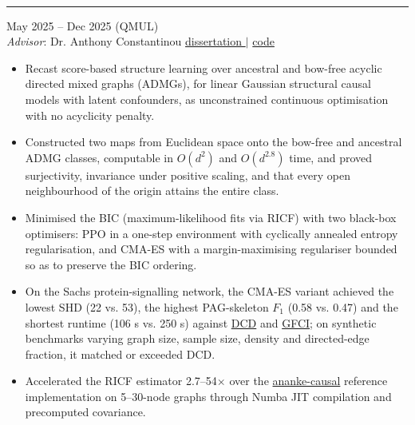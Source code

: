 \documentclass[9pt]{extarticle}
\begin{document}
{    %
    \vspace{10pt}
     \\
    \vspace{-7pt}
    \hrule
    \vspace{5pt}
     \hfill May 2025 -- Dec 2025 (QMUL) \\
    \textit{Advisor}: Dr. Anthony Constantinou \hfill \href{https://github.com/TheDansmod/qmul-msc-ai-code-master-thesis/blob/main/dissertation_report.pdf}{dissertation \faExternalLink*} $\vert$ \href{https://github.com/TheDansmod/qmul-msc-ai-code-master-thesis}{code \faExternalLink*}
    \begin{itemize}[leftmargin=*]
        \item Recast score-based structure learning over ancestral and bow-free acyclic directed mixed graphs (ADMGs), for linear Gaussian structural causal models with latent confounders, as unconstrained continuous optimisation with no acyclicity penalty.
        \item Constructed two maps from Euclidean space onto the bow-free and ancestral ADMG classes, computable in \(O(d^2)\) and \(O(d^2.8)\) time, and proved surjectivity, invariance under positive scaling, and that every open neighbourhood of the origin attains the entire class.
        \item Minimised the BIC (maximum-likelihood fits via RICF) with two black-box optimisers: PPO in a one-step environment with cyclically annealed entropy regularisation, and CMA-ES with a margin-maximising regulariser bounded so as to preserve the BIC ordering.
        \item On the Sachs protein-signalling network, the CMA-ES variant achieved the lowest SHD (22 vs. 53), the highest PAG-skeleton \(F_{1}\) (0.58 vs. 0.47) and the shortest runtime (106 s vs. 250 s) against \href{https://arxiv.org/abs/2010.06978}{DCD} and \href{https://proceedings.mlr.press/v52/ogarrio16.html}{GFCI}; on synthetic benchmarks varying graph size, sample size, density and directed-edge fraction, it matched or exceeded DCD.
        \item Accelerated the RICF estimator 2.7--54\(\times\) over the \href{https://ananke.readthedocs.io/en/latest/}{ananke-causal} reference implementation on 5--30-node graphs through Numba JIT compilation and precomputed covariance.
    \end{itemize}

}
\end{document}
